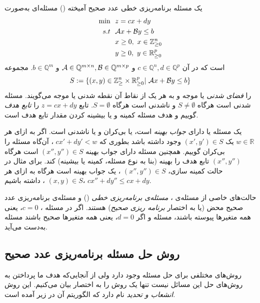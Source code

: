 یک مسئله‌  برنامه‌ریزی خطی عدد صحیح آمیخته ()
مسئله‌ای به‌صورت 
\begin{align*}
\min \  &\ z = cx + dy\\
s.t \  &\ {\mathcal A} x + {\mathcal B} y\leq b\\
& \ x\geq 0, \ x\in \mathbb{Z}_{\geq 0}^{n}\\
& \ y\geq 0, \ y\in \mathbb{R}_{\geq 0}^{p}
\end{align*}
است که در آن 
$c\in \mathbb{Q}^{n}, d\in \mathbb{Q}^{p}$
و 
${\mathcal A}\in \mathbb{Q}^{m\times n}, {\mathcal B}\in \mathbb{Q}^{m\times p}$
و
$b\in \mathbb{Q}^{m}$. 
مجموعه‌ 
$$S:= \{(x,y)\in \mathbb{Z}_{\geq}^{n}\times \mathbb{R}_{\geq 0}^{p}| \ {\mathcal A} x + {\mathcal B} y\leq b\}$$
را 
\textit{فضای شدنی}
یا موجه و به هر یک از نقاط آن نقطه‌  شدنی یا موجه می‌گویند.  مسئله‌  
 شدنی است هرگاه 
$S\neq \emptyset$
و ناشدنی است هرگاه 
$S = \emptyset$.
تابع 
$z = cx + dy$
را 
\textit{تابع هدف}
گوییم و هدف مسئله کمینه و یا بیشینه کردن مقدار تابع هدف است.


یک مسئله‌  
یا دارای 
\textit{جواب بهینه}
است، یا بی‌کران  و یا ناشدنی است. اگر به ازای هر 
$w\in \mathbb{R}$
یک 
$(x',y')\in S$
وجود داشته باشد بطوری که 
$cx' + dy' < w$
، آن‌گاه مسئله‌ 
را بی‌کران گوییم. همچنین مسئله دارای جواب بهینه 
$(x'',y'')\in S$
است هرگاه 
$(x'', y'')$
تابع هدف را بهینه (بنا به نوع مسئله، کمینه یا بیشینه) کند. برای مثال در حالت کمینه سازی، 
$(x'',y'')\in S$
، یک جواب بهینه است هرگاه به‌ ازای هر 
$(x,y)\in S$
، داشته باشیم، 
$c x'' + d y''\leq c x + d y$.


حالت‌های خاصی از مسئله‌ی 
،
\textit{مسئله‌ی برنامه‌ریزی خطی}
()
و مسئله‌ی 
برنامه‌ریزی عدد صحیح محض
(یا به اختصار 
\textit{برنامه ریزی صحیح})
هستند. اگر در مسئله‌ 
،
$c = 0$، 
 یعنی همه‌  متغیرها پیوسته باشند، مسئله‌  
 و اگر
 $d = 0$،
  یعنی همه‌  متغیرها صحیح باشند مسئله‌ 
به‌دست  می‌آید. 

\subsection*{روش‌ حل مسئله‌  برنامه‌ریزی عدد صحیح}
روش‌های مختلفی برای حل مسئله‌ 
وجود دارد ولی از آنجایی‌که هدف ما پرداختن به روش‌های حل این مسائل نیست تنها یک روش را به اختصار بیان می‌کنیم. این روش 
\textit{انشعاب و تحدید}
نام دارد که الگوریتم آن در زیر آمده است. 


